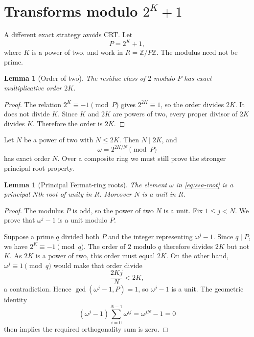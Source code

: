 \documentclass[11pt]{book}
\newtheorem{lemma}[theorem]{Lemma}
\theoremstyle{definition}
\newcommand{\ZZ}{\mathbb Z}
\begin{document}
\section{Transforms modulo $2^K+1$}

A different exact strategy avoids CRT.  Let
\begin{equation}\label{eq:fermat-modulus}
 P=2^K+1,
\end{equation}
where $K$ is a power of two, and work in
$R=\ZZ/P\ZZ$.  The modulus need not be prime.

\begin{lemma}[Order of two]\label{lem:fermat-two-order}
The residue class of $2$ modulo $P$ has exact multiplicative order $2K$.
\end{lemma}

\begin{proof}
The relation $2^K\equiv-1\pmod P$ gives $2^{2K}\equiv1$, so the order divides
$2K$.  It does not divide $K$.  Since $K$ and $2K$ are powers of two, every
proper divisor of $2K$ divides $K$.  Therefore the order is $2K$.
\end{proof}

Let $N$ be a power of two with $N\leq2K$.  Then $N\mid2K$, and
\begin{equation}\label{eq:ssa-root}
 \omega=2^{2K/N}\pmod P
\end{equation}
has exact order $N$.  Over a composite ring we must still prove the stronger
principal-root property.

\begin{lemma}[Principal Fermat-ring roots]\label{lem:fermat-principal-root}
The element $\omega$ in \eqref{eq:ssa-root} is a principal $N$th root of
unity in $R$.  Moreover $N$ is a unit in $R$.
\end{lemma}

\begin{proof}
The modulus $P$ is odd, so the power of two $N$ is a unit.  Fix
$1\leq j<N$.  We prove that $\omega^j-1$ is a unit modulo $P$.

Suppose a prime $q$ divided both $P$ and the integer representing
$\omega^j-1$.  Since $q\mid P$, we have $2^K\equiv-1\pmod q$.  The order of
$2$ modulo $q$ therefore divides $2K$ but not $K$.  As $2K$ is a power of
two, this order must equal $2K$.  On the other hand,
$\omega^j\equiv1\pmod q$ would make that order divide
\[
 \frac{2Kj}{N}<2K,
\]
a contradiction.  Hence $\gcd(\omega^j-1,P)=1$, so $\omega^j-1$ is a unit.
The geometric identity
\[
 (\omega^j-1)\sum_{i=0}^{N-1}\omega^{ij}=\omega^{jN}-1=0
\]
then implies the required orthogonality sum is zero.
\end{proof}
\end{document}
